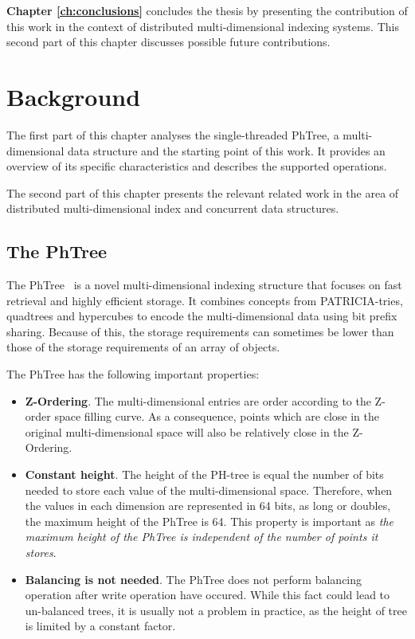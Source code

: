 \documentclass[11pt,a4paper]{globis-book}
\begin{document}
\textbf{Chapter \ref{ch:conclusions}} concludes the thesis by presenting the contribution of this work in the context of distributed multi-dimensional indexing systems. This second part of this chapter discusses possible future contributions.

\chapter{Background}
\label{ch:background}
The first part of this chapter analyses the single-threaded PhTree, a multi-dimensional data structure and the starting point of this work. It provides an overview of its specific characteristics and describes the supported operations.

The second part of this chapter presents the relevant related work in the area of distributed multi-dimensional index and concurrent data structures. 

\section{The PhTree}
\label{sec:background-phtree}

The PhTree~\cite{Zaschke2014} is a novel multi-dimensional indexing structure that focuses on fast retrieval and highly efficient storage. It combines concepts from PATRICIA-tries, quadtrees and hypercubes to encode the multi-dimensional data using bit prefix sharing. Because of this, the storage requirements can sometimes be lower than those of the storage requirements of an array of objects.

The PhTree has the following important properties:
\begin{itemize}
    \item \textbf{Z-Ordering}. The multi-dimensional entries are order according to the Z-order space filling curve. As a consequence, points which are close in the original multi-dimensional space will also be relatively close in the Z-Ordering.
    \item \textbf{Constant height}. The height of the PH-tree is equal the number of bits needed to store each value of the multi-dimensional space. Therefore, when the values in each dimension are represented in 64 bits, as long or doubles, the maximum height of the PhTree is 64. This property is important as \textit{the maximum height of the PhTree is independent of the number of points it stores}.
    \item \textbf{Balancing is not needed}. The PhTree does not perform balancing operation after write operation have occured. While this fact could lead to un-balanced trees, it is usually not a problem in practice, as the height of tree is limited by a constant factor.
\end{itemize}
\end{document}
